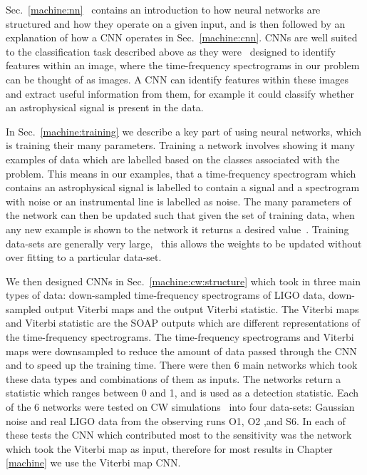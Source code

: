 Sec.~\ref{machine:nn}~ contains an introduction to how neural networks are
structured and how they operate on a given input, and is then followed by an
explanation of how a \gls{CNN} operates in Sec.~\ref{machine:cnn}.  \glspl{CNN}
are well suited to the classification task described above as they
were~ designed to identify features within an image, where
the time-frequency spectrograms in our problem can be thought of as images.  A
\gls{CNN} can identify features within these images and extract useful
information from them, for example it could classify whether an astrophysical
signal is present in the data.

In Sec.~\ref{machine:training} we describe a key part of using neural networks,
which is training their many parameters.  Training a network involves showing
it many examples of data which are labelled based on the classes associated
with the problem.  This means in our examples, that a time-frequency
spectrogram which contains an astrophysical signal is labelled to contain a
signal and a spectrogram with noise or an instrumental line is labelled as
noise.  The many parameters of the network can then be updated such that given
the set of training data, when any new example is shown to the network it
returns a desired value~.
Training data-sets are generally very large,~ this allows the
weights to be updated without over fitting to a particular data-set. 

We then designed \glspl{CNN} in Sec.~\ref{machine:cw:structure} which took in
three main types of data: down-sampled time-frequency spectrograms of
\gls{LIGO} data, down-sampled output Viterbi maps and the output Viterbi
statistic.  The Viterbi maps and Viterbi statistic are the SOAP outputs which
are different representations of the time-frequency spectrograms.  The
time-frequency spectrograms and Viterbi maps were downsampled to reduce the
amount of data passed through the \gls{CNN} and to speed up the training time.
There were then 6 main networks which took these data types and combinations of
them as inputs.  The networks return a statistic which ranges between 0 and 1,
and is used as a detection statistic.  Each of the 6 networks were tested on
\gls{CW} simulations~ into four data-sets: Gaussian noise and
real \gls{LIGO} data from the observing runs O1, O2 ,and S6.  In each of these
tests the \gls{CNN} which contributed most to the sensitivity was the network
which took the Viterbi map as input, therefore for most results in Chapter
\ref{machine} we use the Viterbi map \gls{CNN}. 

